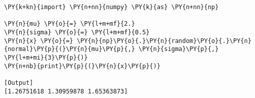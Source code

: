 \begin{Verbatim}[label=\makebox{\href{https://bitbucket.org/lbaldini/statnotes/src/master/snippets/np.random.normal.py}{https://bitbucket.org/.../np.random.normal.py}},commandchars=\\\{\}]
\PY{k+kn}{import} \PY{n+nn}{numpy} \PY{k}{as} \PY{n+nn}{np}

\PY{n}{mu} \PY{o}{=} \PY{l+m+mf}{2.}
\PY{n}{sigma} \PY{o}{=} \PY{l+m+mf}{0.5}
\PY{n}{x} \PY{o}{=} \PY{n}{np}\PY{o}{.}\PY{n}{random}\PY{o}{.}\PY{n}{normal}\PY{p}{(}\PY{n}{mu}\PY{p}{,} \PY{n}{sigma}\PY{p}{,} \PY{l+m+mi}{3}\PY{p}{)}
\PY{n+nb}{print}\PY{p}{(}\PY{n}{x}\PY{p}{)}

[Output]
[1.26751618 1.30959878 1.65363873]
\end{Verbatim}